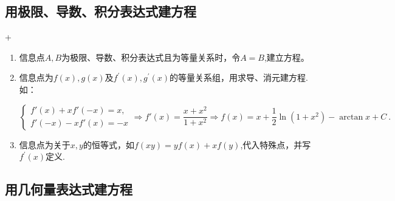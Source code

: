 \DThree
\subsection{用极限、导数、积分表达式建方程}
\DTwoTwo+\DThree
\begin{enumerate}
    \item 信息点$A,B$为极限、导数、积分表达式且为等量关系时，令$A=B$,建立方程。
    \item 信息点为$f(x),g(x)$及$f^\prime(x),g^{\prime}(x)$的等量关系组，用求导、消元建方程.如：

          $$\begin{cases}f'(x)+xf'(-x)=x,\\f'(-x)-xf'(x)=-x\end{cases}\Rightarrow f'(x)=\frac{x+x^2}{1+x^2}\Rightarrow f(x)=x+\frac{1}{2}\ln(1+x^2)-\arctan x+C\:.$$
    \item 信息点为关于$x,y$的恒等式，如$f(xy)=yf(x)+xf(y)$,代入特殊点，并写$f^\prime(x)$定义.
\end{enumerate}
\subsection{用几何量表达式建方程}
\DThree

